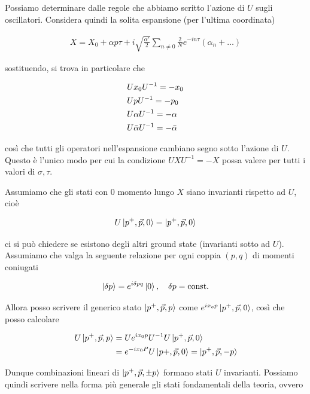 \documentclass{report}
\begin{document}
Possiamo determinare dalle regole che abbiamo scritto l'azione di \(U\) sugli oscillatori. Considera quindi la solita espansione (per l'ultima coordinata)

\begin{align}
    X = X_0 + \alpha p \tau + i\sqrt{\frac{\alpha'}{2}} \sum_{n\neq 0}\frac{2}{N}e^{-in\tau}(\alpha_n + \ldots)
\end{align}

sostituendo, si trova in particolare che 

\begin{align}
    &U x_0 U^{-1} = -x_0 \notag \\ 
    &UpU^{-1} = -p_0 \notag \\
    &U\alpha U^{-1} = -\alpha \\ 
    &U\bar{\alpha}U^{-1} = -\bar{\alpha} 
\end{align}

così che tutti gli operatori nell'espansione cambiano segno sotto l'azione di \(U\). Questo è l'unico modo per cui la condizione \(UXU^{-1} = -X\) possa valere per tutti i valori di \(\sigma, \tau\). 

Assumiamo che gli stati con \(0\) momento lungo \(X\) siano invarianti rispetto ad \(U\), cioè 

\begin{align}
    U \ket{p^+, \vec{p}, 0} = \ket{p^+, \vec{p}, 0}
\end{align}

ci si può chiedere se esistono degli altri ground state (invarianti sotto ad \(U\)). Assumiamo che valga la seguente relazione per ogni coppia \((p,q)\) di momenti coniugati

\begin{align}
    \ket{\delta p} = e^{i\delta p q} \ket{0}, \quad \delta p = \text{const.}
\end{align}

Allora posso scrivere il generico stato \(\ket{p^+, \vec{p}, p}\) come \(e^{ix_o p}\ket{p^+, \vec{p}, 0}\), così che posso calcolare 

\begin{align}
    U \ket{p^+, \vec{p}, p} &= Ue^{ix_0p}U^{-1} U\ket{p^+, \vec{p}, 0} \notag \\ 
    &= e^{-ix_0P} U \ket{p+, \vec{p}, 0} = \ket{p^+, \vec{p}, -p}
\end{align}

Dunque combinazioni lineari di \(\ket{p^+, \vec{p}, \pm p}\) formano stati \(U\) invarianti. Possiamo quindi scrivere nella forma più generale gli stati fondamentali della teoria, ovvero 
\end{document}

